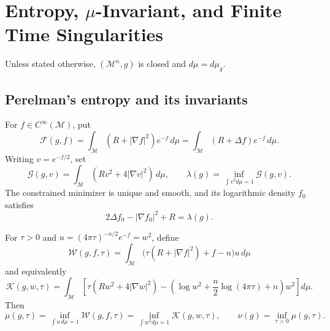 \chapter[17]{Entropy, \texorpdfstring{$\mu$}{mu}-Invariant, and Finite Time Singularities}
\label{ch:chow-iii-entropy-mu-finite-time-singularities}

Unless stated otherwise, \((\mathcal M^n,g)\) is closed and
\(d\mu=d\mu_g\).

\section{Perelman's entropy and its invariants}

\begin{definition}
\label{def:chow-iii-ch17-perelman-energy-lambda}

For $f\in C^\infty(\mathcal M)$, put
\[
 \mathcal F(g,f)=\int_{\mathcal M}(R+|\nabla f|^2)e^{-f}\,d\mu
 =\int_{\mathcal M}(R+\Delta f)e^{-f}\,d\mu.
\]
Writing $v=e^{-f/2}$, set
\[
 \mathcal G(g,v)=\int_{\mathcal M}(Rv^2+4|\nabla v|^2)\,d\mu,
 \qquad
 \lambda(g)=\inf_{\int v^2d\mu=1}\mathcal G(g,v).
\]
The constrained minimizer is unique and smooth, and its logarithmic density
$f_0$ satisfies
\[
 2\Delta f_0-|\nabla f_0|^2+R=\lambda(g).
\]
\end{definition}

\begin{definition}
\label{def:chow-iii-ch17-perelman-entropy-mu-nu}

For $\tau>0$ and
$u=(4\pi\tau)^{-n/2}e^{-f}=w^2$, define
\[
 \mathcal W(g,f,\tau)=\int_{\mathcal M}
 \bigl(\tau(R+|\nabla f|^2)+f-n\bigr)u\,d\mu
\]
and equivalently
\[
 \mathcal K(g,w,\tau)=\int_{\mathcal M}
 \left[\tau(Rw^2+4|\nabla w|^2)
 -\left(\log w^2+\frac n2\log(4\pi\tau)+n\right)w^2\right]d\mu.
\]
Then
\[
 \mu(g,\tau)=\inf_{\int u\,d\mu=1}\mathcal W(g,f,\tau)
 =\inf_{\int w^2d\mu=1}\mathcal K(g,w,\tau),
 \qquad \nu(g)=\inf_{\tau>0}\mu(g,\tau).
\]
\end{definition}

